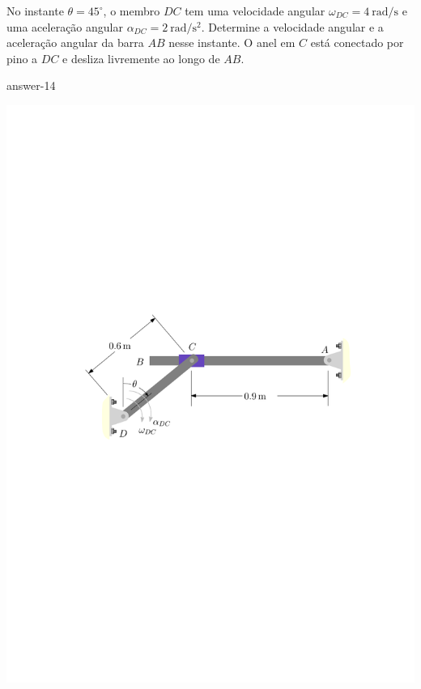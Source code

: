 \item  No instante $\theta=45^{\circ}$, o membro $DC$ tem uma velocidade angular $\omega_{DC}=\SI{4}{\radian/\second}$ e uma aceleração angular $\alpha_{DC}=\SI{2}{\radian/\second^{2}}$. Determine a velocidade angular e a aceleração angular da barra $AB$ nesse instante. O anel em $C$ está conectado por pino a $DC$ e desliza livremente ao longo de $AB$.

{answer-14}

\begin{flushright}
	\includegraphics[scale=1]{images/draw_12}
\end{flushright}